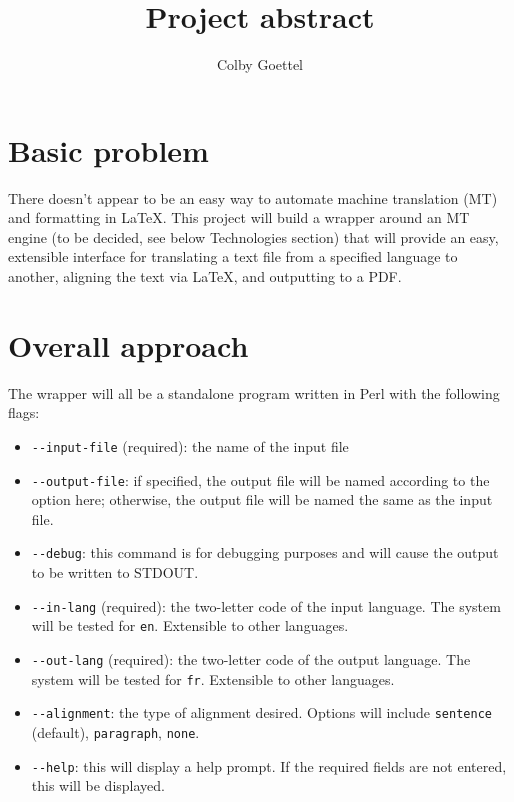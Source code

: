 \documentclass{article}
\title{Project abstract}
\author{Colby Goettel}
\begin{document}
\maketitle

\section{Basic problem}
There doesn't appear to be an easy way to automate machine translation (MT) and formatting in \LaTeX. This project will build a wrapper around an MT engine (to be decided, see below Technologies section) that will provide an easy, extensible interface for translating a text file from a specified language to another, aligning the text via \LaTeX, and outputting to a PDF.

\section{Overall approach}
The wrapper will all be a standalone program written in Perl with the following flags:
\begin{itemize}
    \item \verb+--input-file+ (required): the name of the input file
    \item \verb+--output-file+: if specified, the output file will be named according to the option here; otherwise, the output file will be named the same as the input file.
    \item \verb+--debug+: this command is for debugging purposes and will cause the output to be written to STDOUT.
    \item \verb+--in-lang+ (required): the two-letter code of the input language. The system will be tested for \texttt{en}. Extensible to other languages.
    \item \verb+--out-lang+ (required): the two-letter code of the output language. The system will be tested for \texttt{fr}. Extensible to other languages.
    \item \verb+--alignment+: the type of alignment desired. Options will include \texttt{sentence} (default), \texttt{paragraph}, \texttt{none}.
    \item \verb+--help+: this will display a help prompt. If the required fields are not entered, this will be displayed.
\end{itemize}
\end{document}

